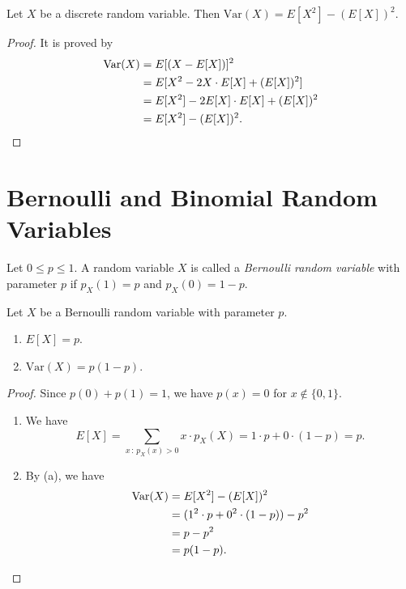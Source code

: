 \begin{theorem}
  Let $X$ be a discrete random variable.
  Then $\mathrm{Var}(X) = E[X^2] - (E[X])^2$.
\end{theorem}
\begin{proof}
  It is proved by
  \begin{align*}
    \mathrm{Var}(X)
    &= E[(X - E[X])]^2 \\
    &= E[X^2 - 2X \cdot E[X] + (E[X])^2] \\
    &= E[X^2] - 2E[X] \cdot E[X] + (E[X])^2 \\
    &= E[X^2] - (E[X])^2. \qedhere
  \end{align*}
\end{proof}

\section{Bernoulli and Binomial Random Variables}
\begin{definition}
  Let $0 \leq p \leq 1$.
  A random variable $X$ is called a \emph{Bernoulli random variable} with
  parameter $p$ if $p_X(1) = p$ and $p_X(0) = 1 - p$.
\end{definition}

\begin{theorem}
  Let $X$ be a Bernoulli random variable with parameter $p$.
  \begin{enumerate}
    \item $E[X] = p$.
    \item $\mathrm{Var}(X) = p(1 - p)$.
  \end{enumerate}
\end{theorem}
\begin{proof}
  Since $p(0) + p(1) = 1$, we have $p(x) = 0$ for $x \notin \{0, 1\}$.
  \begin{enumerate}
    \item We have
      \begin{equation*}
        E[X] = \sum_{x\,:\,p_X(x) > 0} x \cdot p_X(X)
             = 1 \cdot p + 0 \cdot (1 - p)
             = p.
      \end{equation*}
    \item By (a), we have
      \begin{align*}
        \mathrm{Var}(X)
        &= E[X^2] - (E[X])^2 \\
        &= (1^2 \cdot p + 0^2 \cdot (1-p)) - p^2 \\
        &= p - p^2 \\
        &= p(1-p). \qedhere
      \end{align*}
  \end{enumerate}
\end{proof}

